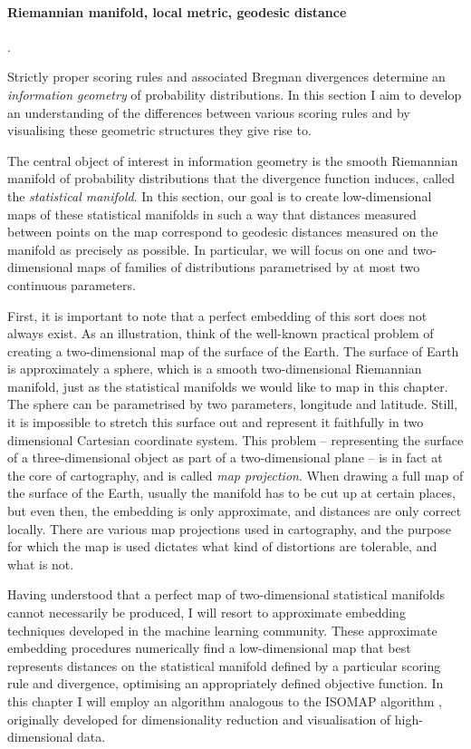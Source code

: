 \paragraph{Riemannian manifold, local metric, geodesic distance}.

Strictly proper scoring rules and associated Bregman divergences determine an \emph{information geometry} of probability distributions. In this section I aim to develop an understanding of the differences between various scoring rules and by visualising these geometric structures they give rise to.

The central object of interest in information geometry is the smooth Riemannian manifold of probability distributions that the divergence function induces, called the \emph{statistical manifold}. In this section, our goal is to create low-dimensional maps of these statistical manifolds in such a way that distances measured between points on the map correspond to geodesic distances measured on the manifold as precisely as possible. In particular, we will focus on one and two-dimensional maps of families of distributions parametrised by at most two continuous parameters.

First, it is important to note that a perfect embedding of this sort does not always exist. As an illustration, think of the well-known practical problem of creating a two-dimensional map of the surface of the Earth. The surface of Earth is approximately a sphere, which is a smooth two-dimensional Riemannian manifold, just as the statistical manifolds we would like to map in this chapter. The sphere can be parametrised by two parameters, longitude and latitude. Still, it is impossible to stretch this surface out and represent it faithfully in two dimensional Cartesian coordinate system. This problem -- representing the surface of a three-dimensional object as part of a two-dimensional plane -- is in fact at the core of cartography, and is called \emph{map projection}. When drawing a full map of the surface of the Earth, usually the manifold has to be cut up at certain places, but even then, the embedding is only approximate, and distances are only correct locally. There are various map projections used in cartography, and the purpose for which the map is used dictates what kind of distortions are tolerable, and what is not.

Having understood that a perfect map of two-dimensional statistical manifolds cannot necessarily be produced, I will resort to approximate embedding techniques developed in the machine learning community. These approximate embedding procedures numerically find a low-dimensional map that best represents distances on the statistical manifold defined by a particular scoring rule and divergence, optimising an appropriately defined objective function. In this chapter I will employ an algorithm analogous to the ISOMAP algorithm \citep{isomap}, originally developed for dimensionality reduction and visualisation of high-dimensional data.

